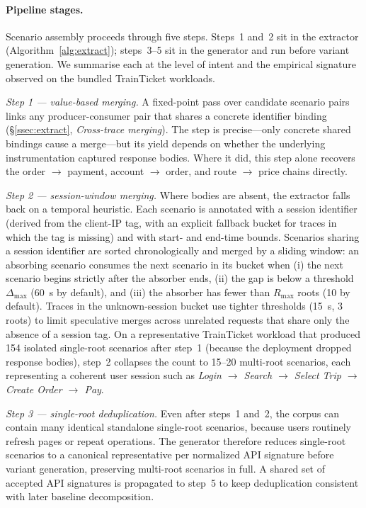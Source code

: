 \documentclass[conference]{IEEEtran}
\begin{document}
\paragraph{Pipeline stages.}
Scenario assembly proceeds through five steps. Steps~1 and~2 sit in the extractor (Algorithm~\ref{alg:extract}); steps~3--5 sit in the generator and run before variant generation. We summarise each at the level of intent and the empirical signature observed on the bundled TrainTicket workloads.

\emph{Step 1 --- value-based merging.}
A fixed-point pass over candidate scenario pairs links any producer-consumer pair that shares a concrete identifier binding (\S\ref{ssec:extract}, \emph{Cross-trace merging}). The step is precise---only concrete shared bindings cause a merge---but its yield depends on whether the underlying instrumentation captured response bodies. Where it did, this step alone recovers the order $\to$ payment, account $\to$ order, and route $\to$ price chains directly.

\emph{Step 2 --- session-window merging.}
Where bodies are absent, the extractor falls back on a temporal heuristic. Each scenario is annotated with a session identifier (derived from the client-IP tag, with an explicit fallback bucket for traces in which the tag is missing) and with start- and end-time bounds. Scenarios sharing a session identifier are sorted chronologically and merged by a sliding window: an absorbing scenario consumes the next scenario in its bucket when (i) the next scenario begins strictly after the absorber ends, (ii) the gap is below a threshold $\Delta_{\max}$ (60~s by default), and (iii) the absorber has fewer than $R_{\max}$ roots (10 by default). Traces in the unknown-session bucket use tighter thresholds (15~s, 3 roots) to limit speculative merges across unrelated requests that share only the absence of a session tag. On a representative TrainTicket workload that produced 154 isolated single-root scenarios after step~1 (because the deployment dropped response bodies), step~2 collapses the count to 15--20 multi-root scenarios, each representing a coherent user session such as \emph{Login $\to$ Search $\to$ Select Trip $\to$ Create Order $\to$ Pay}.

\emph{Step 3 --- single-root deduplication.}
Even after steps~1 and~2, the corpus can contain many identical standalone single-root scenarios, because users routinely refresh pages or repeat operations. The generator therefore reduces single-root scenarios to a canonical representative per normalized API signature before variant generation, preserving multi-root scenarios in full. A shared set of accepted API signatures is propagated to step~5 to keep deduplication consistent with later baseline decomposition.
\end{document}
